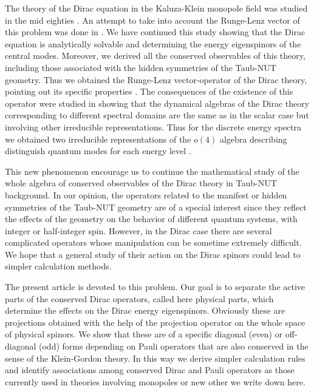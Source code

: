 \documentclass[a4paper,12pt]{article}
\begin{document}
The theory of the Dirac equation in the Kaluza-Klein monopole field was 
studied in the mid eighties \cite{DIRAC}. An attempt to take into account 
the Runge-Lenz vector of this problem was done in \cite{CH}. We have 
continued this study showing that the Dirac equation is analytically 
solvable \cite{CV2} and determining the energy eigenspinors of the 
central modes. Moreover, we derived all the conserved observables of 
this theory, including those associated with the hidden symmetries of 
the Taub-NUT geometry. Thus we obtained the Runge-Lenz vector-operator 
of the Dirac theory, pointing out its specific properties \cite{CV3}. 
The consequences of the existence of this  operator were studied 
in \cite{CV4} showing that the dynamical algebras of the Dirac theory 
corresponding to different spectral domains are the same as in the scalar 
case \cite{GRFH} but involving  other irreducible representations. Thus 
for the discrete energy spectra we  obtained two irreducible 
representations of the $o(4)$ algebra describing distinguish quantum 
modes for each energy level \cite{CV4}. 

This new phenomenon encourage us to continue the mathematical study 
of the whole algebra of conserved observables of the Dirac theory in 
Taub-NUT background. In our opinion, the  operators related to the 
manifest or hidden symmetries of the Taub-NUT geometry  are of a special 
interest since they reflect the effects of the geometry on the behavior 
of different quantum systems, with integer or half-integer spin. However, 
in the Dirac case there are several complicated operators whose  
manipulation can be  sometime  extremely difficult. We hope that a general 
study of their action on the Dirac spinors could lead to simpler 
calculation methods.    
     
The present article is devoted to this problem. Our goal is to separate the 
active parts of the conserved Dirac operators, called here physical parts, 
which determine the effects on the Dirac energy eigenspinors. Obviously 
these are projections obtained with the help of the projection operator on 
the whole space of physical spinors. We show that these are of a specific 
diagonal (even) or off-diagonal (odd) forms depending on Pauli operators 
that are also conserved in the sense of the Klein-Gordon theory. In this 
way we derive  simpler calculation rules and  identify associations among  
conserved Dirac and  Pauli operators as those currently used in theories 
involving monopoles \cite{DYON,JMP,HMH} or new other we write down here. 
\end{document}
